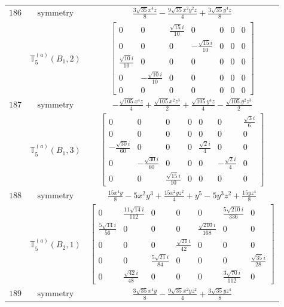 \documentclass[fleqn,8pt,landscape]{jsarticle}
\begin{document}
\begin{longtable}{ccc}
$ 186 $ & $ \text{symmetry} $ & $ \frac{3 \sqrt{35} x^{4} z}{8} - \frac{9 \sqrt{35} x^{2} y^{2} z}{4} + \frac{3 \sqrt{35} y^{4} z}{8} $ \\
$  $ & $ \mathbb{T}_{5}^{(a)}(B_{1},2) $ & $ \begin{bmatrix} 0 & 0 & \frac{\sqrt{15} i}{10} & 0 & 0 & 0 & 0 \\ 0 & 0 & 0 & - \frac{\sqrt{15} i}{10} & 0 & 0 & 0 \\ \frac{\sqrt{10} i}{10} & 0 & 0 & 0 & 0 & 0 & 0 \\ 0 & - \frac{\sqrt{10} i}{10} & 0 & 0 & 0 & 0 & 0 \\ 0 & 0 & 0 & 0 & 0 & 0 & 0 \end{bmatrix} $ \\ \hline
$ 187 $ & $ \text{symmetry} $ & $ - \frac{\sqrt{105} x^{4} z}{4} + \frac{\sqrt{105} x^{2} z^{3}}{2} + \frac{\sqrt{105} y^{4} z}{4} - \frac{\sqrt{105} y^{2} z^{3}}{2} $ \\
$  $ & $ \mathbb{T}_{5}^{(a)}(B_{1},3) $ & $ \begin{bmatrix} 0 & 0 & 0 & 0 & 0 & 0 & \frac{\sqrt{3} i}{6} \\ 0 & 0 & 0 & 0 & 0 & 0 & 0 \\ - \frac{\sqrt{30} i}{60} & 0 & 0 & 0 & \frac{\sqrt{2} i}{4} & 0 & 0 \\ 0 & - \frac{\sqrt{30} i}{60} & 0 & 0 & 0 & - \frac{\sqrt{2} i}{4} & 0 \\ 0 & 0 & \frac{\sqrt{15} i}{10} & 0 & 0 & 0 & 0 \end{bmatrix} $ \\ \hline
$ 188 $ & $ \text{symmetry} $ & $ \frac{15 x^{4} y}{8} - 5 x^{2} y^{3} + \frac{15 x^{2} y z^{2}}{4} + y^{5} - 5 y^{3} z^{2} + \frac{15 y z^{4}}{8} $ \\
$  $ & $ \mathbb{T}_{5}^{(a)}(B_{2},1) $ & $ \begin{bmatrix} 0 & \frac{11 \sqrt{14} i}{112} & 0 & 0 & 0 & \frac{5 \sqrt{210} i}{336} & 0 \\ \frac{5 \sqrt{14} i}{56} & 0 & 0 & 0 & \frac{\sqrt{210} i}{168} & 0 & 0 \\ 0 & 0 & 0 & \frac{\sqrt{21} i}{42} & 0 & 0 & 0 \\ 0 & 0 & \frac{5 \sqrt{21} i}{84} & 0 & 0 & 0 & \frac{\sqrt{35} i}{28} \\ 0 & \frac{\sqrt{42} i}{48} & 0 & 0 & 0 & \frac{3 \sqrt{70} i}{112} & 0 \end{bmatrix} $ \\ \hline
$ 189 $ & $ \text{symmetry} $ & $ \frac{3 \sqrt{35} x^{4} y}{8} - \frac{9 \sqrt{35} x^{2} y z^{2}}{4} + \frac{3 \sqrt{35} y z^{4}}{8} $ \\

\end{longtable}
\end{document}
